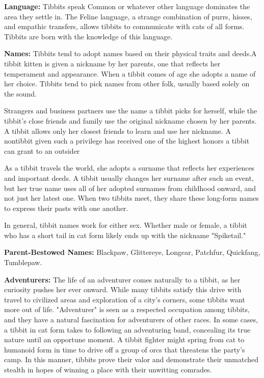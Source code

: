 \textbf{Language:} Tibbits speak Common or whatever other language dominates the area they settle in. The Feline language, a strange combination of purrs, hisses, and
empathic transfers, allows tibbits to communicate with cats of all forms. Tibbits are born with the knowledge of this language.

\textbf{Names:} Tibbits tend to adopt names based on their physical traits and deeds.A tibbit kitten is given a nickname by her parents, one that reflects her temperament and appearance. When a tibbit comes of age she adopts a name of her choice. Tibbits tend to pick names from other folk, usually based solely on the sound.

Strangers and business partners use the name a tibbit picks for herself, while the tibbit's close friends and family use the original nickname chosen by her parents.
A tibbit allows only her closest friends to learn and use her nickname. A nontibbit given such a privilege has received one of the highest honors a tibbit can grant to an outsider

As a tibbit travels the world, she adopts a surname that reflects her experiences and important deeds. A tibbit usually changes her surname after such an event, but
her true name uses all of her adopted surnames from childhood onward, and not just her latest one. When two tibbits meet, they share these long-form names to express
their pasts with one another.

In general, tibbit names work for either sex. Whether male or female, a tibbit who has a short tail in cat form likely ends up with the nickname "Spiketail."

\textbf{Parent-Bestowed Names:} Blackpaw, Glittereye, Longear, Patchfur, Quickfang, Tumblepaw.

\textbf{Adventurers:} The life of an adventurer comes naturally to a tibbit, as her curiosity pushes her ever onward. While many tibbits satisfy this drive with travel to civilized areas and exploration of a city's corners, some tibbits want more out of life. "Adventurer" is seen as a respected occupation among tibbits, and they have a natural fascination for adventurers of other races. In some cases, a tibbit in cat form takes to following an adventuring band, concealing its true nature until an opportune moment. A tibbit fighter might spring from cat to humanoid form in time to drive off a group of orcs that threatens the party's camp. In this manner, tibbits prove their valor and demonstrate their unmatched stealth in hopes of winning a place with their unwitting comrades.

